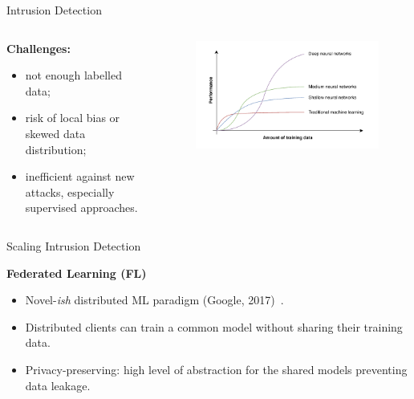 \documentclass[aspectratio=169,10pt]{imta}
\begin{document}
\begin{frame}{Intrusion Detection}

  \begin{columns}
    \begin{column}{0.5\textwidth}
        \textbf{Challenges:}
        \begin{itemize}
          \item not enough labelled data;
          \item risk of local bias or skewed data distribution;
          \item inefficient against new attacks, especially \alert{supervised} approaches.
        \end{itemize}
    \end{column}

    \begin{column}{0.5\textwidth}
      \begin{figure}
        \centering
        \includegraphics[width=\linewidth]{figures/intro/ml-perf}
      \end{figure}
    \end{column}
  \end{columns}
\end{frame}

\begin{frame}{Scaling Intrusion Detection}

  \textbf{Federated Learning (FL)}
  
  \begin{itemize}
    \item Novel-\emph{ish} distributed ML paradigm (Google, 2017)~\cite{mcmahan_Communicationefficientlearningdeep_2017}.
    \item Distributed clients can train a common model without sharing their training data.
    \item Privacy-preserving: high level of abstraction for the shared models preventing data leakage.
  \end{itemize}
\end{frame}
\end{document}
